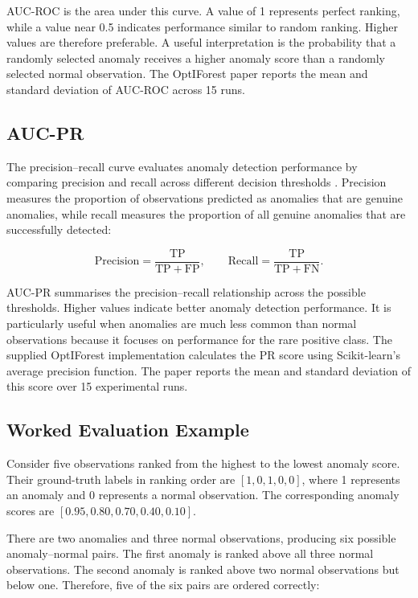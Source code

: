 \documentclass[11pt]{article}
\begin{document}
AUC-ROC is the area under this curve. A value of 1 represents perfect
ranking, while a value near 0.5 indicates performance similar to random
ranking. Higher values are therefore preferable. A useful
interpretation is the probability that a randomly selected anomaly
receives a higher anomaly score than a randomly selected normal
observation. The OptIForest paper reports the mean and standard
deviation of AUC-ROC across 15 runs.

\subsection{AUC-PR}


The precision--recall curve evaluates anomaly detection performance by
comparing precision and recall across different decision thresholds
\citep{saito2015precision}. Precision measures the proportion of
observations predicted as anomalies that are genuine anomalies, while
recall measures the proportion of all genuine anomalies that are
successfully detected:

\[
\mathrm{Precision} =
\frac{\mathrm{TP}}{\mathrm{TP}+\mathrm{FP}},
\qquad
\mathrm{Recall} =
\frac{\mathrm{TP}}{\mathrm{TP}+\mathrm{FN}}.
\]

AUC-PR summarises the precision--recall relationship across the possible
thresholds. Higher values indicate better anomaly detection performance.
It is particularly useful when anomalies are much less common than normal
observations because it focuses on performance for the rare positive
class. The supplied OptIForest implementation calculates the PR score
using Scikit-learn's average precision function. The paper reports the
mean and standard deviation of this score over 15 experimental runs.

\subsection{Worked Evaluation Example}

Consider five observations ranked from the highest to the lowest anomaly
score. Their ground-truth labels in ranking order are
\([1,0,1,0,0]\), where 1 represents an anomaly and 0 represents a normal
observation. The corresponding anomaly scores are
\([0.95,0.80,0.70,0.40,0.10]\).

There are two anomalies and three normal observations, producing six
possible anomaly--normal pairs. The first anomaly is ranked above all
three normal observations. The second anomaly is ranked above two normal
observations but below one. Therefore, five of the six pairs are ordered
correctly:
\end{document}
